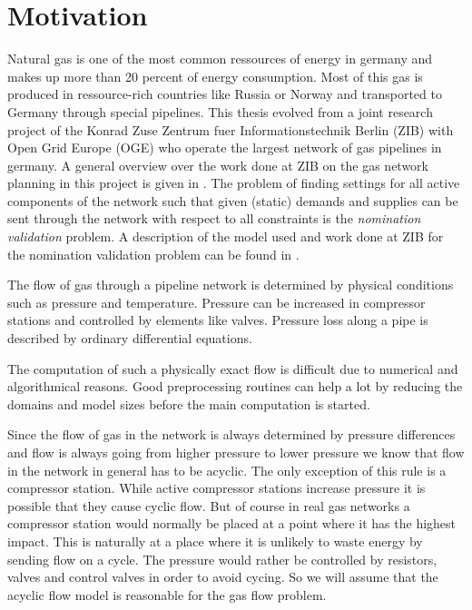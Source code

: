 \section{Motivation}
Natural gas is one of the most common ressources of energy in germany and makes up more than 20 percent of energy 
consumption. Most of this gas is produced in ressource-rich countries like Russia or Norway and transported to Germany 
through special pipelines. 
This thesis evolved from a joint research project of the Konrad Zuse Zentrum fuer Informationstechnik Berlin (ZIB) with 
Open Grid Europe (OGE) who operate the largest network of gas pipelines in germany. 
A general overview over the work done at ZIB on the gas network planning in this project is given in 
\cite{FuegenschuhGeisslerGollmeretal.2013}. The problem of finding settings for all active components of the network 
such that given (static) demands and supplies can be sent through the network with respect to all constraints is the 
\textit{nomination validation} problem. A description of the model used and work done at ZIB for the nomination 
validation problem can be found in \cite{PfetschFuegenschuhGeissleretal.2012}. 

The flow of gas through a pipeline network is determined by physical conditions such as pressure and temperature. 
Pressure can be increased in compressor stations and controlled by elements like valves. Pressure loss along a pipe is 
described by ordinary differential equations. 

The computation of such a physically exact flow is difficult due to numerical and algorithmical reasons. Good 
preprocessing routines can help a lot by reducing the domains and model sizes before the main computation is started.

Since the flow of gas in the network is always determined by pressure differences and flow is always going from higher 
pressure to lower pressure we know that flow in the network in general has to be acyclic. The only exception of this 
rule is a compressor station. While  active compressor stations increase
pressure it is possible that they cause cyclic flow. But of course in real gas networks a compressor station would 
normally be placed at a point where it has the highest impact. This is naturally at a place where it is unlikely to 
waste energy by sending flow on a cycle. The pressure would rather be controlled by resistors, valves and control valves 
in order to avoid cycing. So we will assume that the acyclic flow model is reasonable for the gas flow problem.\\

